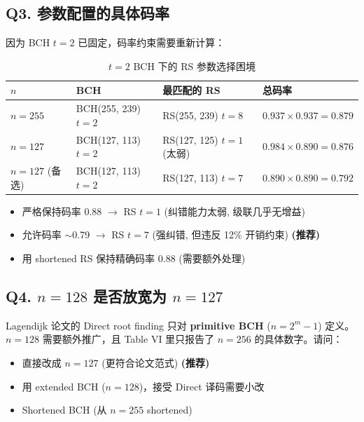 \documentclass[11pt,a4paper]{article}
\begin{document}
\subsection{Q3. 参数配置的具体码率}

因为 BCH $t=2$ 已固定，码率约束需要重新计算：

\begin{table}[!ht]
\centering
\begin{tabularx}{\textwidth}{XXXX}
\toprule
$n$ & BCH & 最匹配的 RS & 总码率 \\
\midrule
$n=255$ & BCH(255, 239) $t=2$ & RS(255, 239) $t=8$ & $0.937 \times 0.937 = 0.879$ \\
$n=127$ & BCH(127, 113) $t=2$ & RS(127, 125) $t=1$ (太弱) & $0.984 \times 0.890 = 0.876$ \\
$n=127$ (备选) & BCH(127, 113) $t=2$ & RS(127, 113) $t=7$ & $0.890 \times 0.890 = 0.792$ \\
\bottomrule
\end{tabularx}
\caption{$t=2$ BCH 下的 RS 参数选择困境}
\end{table}

\begin{actionbox}[title=\textbf{Q3. $n=127$ 的 RS 参数如何选？}]
\begin{itemize}[leftmargin=1em, itemsep=1pt]
\item [(a)] 严格保持码率 0.88 $\to$ RS $t=1$ (纠错能力太弱, 级联几乎无增益)
\item [(b)] 允许码率 $\sim$0.79 $\to$ RS $t=7$ (强纠错, 但违反 12\% 开销约束) \textbf{(推荐)}
\item [(c)] 用 shortened RS 保持精确码率 0.88 (需要额外处理)
\end{itemize}
\end{actionbox}

\subsection{Q4. $n=128$ 是否放宽为 $n=127$}

\begin{actionbox}[title=\textbf{Q4. $n=128$ 用 extended BCH 还是直接 $n=127$？}]
Lagendijk 论文的 Direct root finding 只对 \textbf{primitive BCH} ($n = 2^m - 1$) 定义。
$n=128$ 需要额外推广，且 Table VI 里只报告了 $n=256$ 的具体数字。请问：

\begin{itemize}[leftmargin=1em, itemsep=1pt]
\item [(a)] 直接改成 $n=127$ (更符合论文范式) \textbf{(推荐)}
\item [(b)] 用 extended BCH ($n=128$)，接受 Direct 译码需要小改
\item [(c)] Shortened BCH (从 $n=255$ shortened)
\end{itemize}
\end{actionbox}
\end{document}
